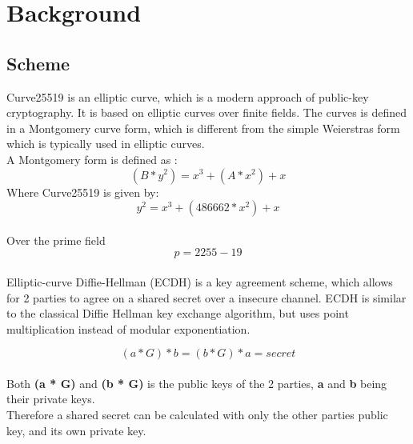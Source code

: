 \section{Background}
\subsection{Scheme}
Curve25519 is an elliptic curve, which is a modern approach of public-key cryptography. It is based on elliptic curves over finite fields.
The curves is defined in a Montgomery curve form, which is different from the simple Weierstras form which is typically used in elliptic curves.\\
A Montgomery form is defined as \cite{cryptobook}:\\
\[(B * y^2) = x^3 + (A * x^2) + x\]
Where Curve25519 is given by:\\
\[y^2 = x^3 + (486662 * x^2) + x\]\\
Over the prime field 
\[p = 2255 - 19\]\\
Elliptic-curve Diffie-Hellman (ECDH) is a key agreement scheme, which allows for 2 parties to agree on a shared secret over a insecure channel.
ECDH is similar to the classical Diffie Hellman key exchange algorithm, but uses point multiplication instead of modular exponentiation.

\[(a * G) * b = (b * G) * a = secret\]\\
Both \textbf{(a * G)} and \textbf{(b * G)} is the public keys of the 2 parties, \textbf{a} and \textbf{b} being their private keys.\\
Therefore a shared secret can be calculated with only the other parties public key, and its own private key.



\pagebreak

